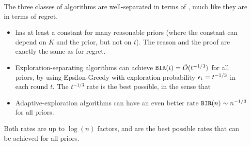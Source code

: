The three classes of algorithms are well-separated in terms of \BIR, much like they are in terms of regret. 

\begin{itemize}
\item \DynGreedy has at least a constant \BIR for many reasonable priors (where the constant can depend on $K$ and the prior, but not on $t$). The reason and the proof are exactly the same as for regret. 
    
\item Exploration-separating algorithms can achieve
    $\mathtt{BIR}(t) = \tilde{O}(t^{-1/3})$
for all priors, \eg by using Epsilon-Greedy with exploration probability $\epsilon_t = t^{-1/3}$ in each round $t$. 
The $t^{-1/3}$ rate is the best possible, in the sense that


\item Adaptive-exploration algorithms can have an even better rate
    $\mathtt{BIR}(n) \sim n^{-1/3}$
for all priors. 
\end{itemize}

Both rates are up to $\log(n)$ factors, and are the best possible \BIR rates that can be achieved for all priors.

